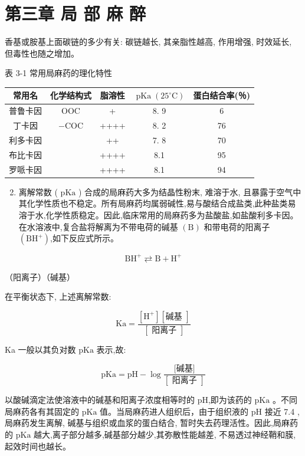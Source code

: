 \documentclass[10pt]{article}
\begin{document}
\section*{第三章 局 部 麻 醉}
香基或胺基上面碳链的多少有关: 碳链越长, 其亲脂性越高, 作用增强, 时效延长, 但毒性也随之增加。

表 3-1 常用局麻药的理化特性

\begin{center}
\begin{tabular}{|c|c|c|c|c|}
\hline
常用名 & 化学结构式 & 脂溶性 & $\operatorname{pKa}\left(25^{\circ} \mathrm{C}\right)$ & 蛋白结合率(％) \\
\hline
普鲁卡因 & $\mathrm{OOC}$ & + & 8. 9 & 6 \\
\hline
丁卡因 & $-\mathrm{COC}$ & ++++ & 8. 2 & 76 \\
\hline
利多卡因 &  & ++ & 7. 8 & 70 \\
\hline
布比卡因 &  & ++++ & 8.1 & 95 \\
\hline
罗哌卡因 &  & ++++ & 8.1 & 94 \\
\hline
\end{tabular}
\end{center}

\begin{enumerate}
  \setcounter{enumi}{1}
  \item 离解常数 ( $\mathrm{pKa}$ ) 合成的局麻药大多为结晶性粉末, 难溶于水, 且暴露于空气中其化学性质也不稳定。所有局麻药均属弱碱性,易与酸结合成盐类,此种盐类易溶于水,化学性质稳定。因此,临床常用的局麻药多为盐酸盐,如盐酸利多卡因。在水溶液中,复合盐将解离为不带电荷的碱基 $(\mathrm{B})$ 和带电荷的阳离子 $\left(\mathrm{BH}^{+}\right)$,如下反应式所示。
\end{enumerate}

\[
\mathrm{BH}^{+} \rightleftarrows \mathrm{B}+\mathrm{H}^{+}
\]

（阳离子）（碱基）

在平衡状态下, 上述离解常数:

\[
\mathrm{Ka}=\frac{\left[\mathrm{H}^{+}\right][\text {碱基 }]}{[\text { 阳离子 }]}
\]

Ka 一般以其负对数 $\mathrm{pKa}$ 表示,故:

\[
\mathrm{pKa}=\mathrm{pH}-\log \frac{\text { [碱基] }}{[\text { 阳离子 }]}
\]

以酸碱滴定法使溶液中的碱基和阳离子浓度相等时的 $\mathrm{pH}$,即为该药的 $\mathrm{pKa}$ 。不同局麻药各有其固定的 $\mathrm{pKa}$ 值。当局麻药进人组织后，由于组织液的 $\mathrm{pH}$ 接近 7.4 ,局麻药发生离解, 碱基与组织或血浆的蛋白结合, 暂时失去药理活性。因此,局麻药的 $\mathrm{pKa}$ 越大,离子部分越多,碱基部分越少,其弥散性能越差, 不易透过神经鞘和膜, 起效时间也越长。
\end{document}
